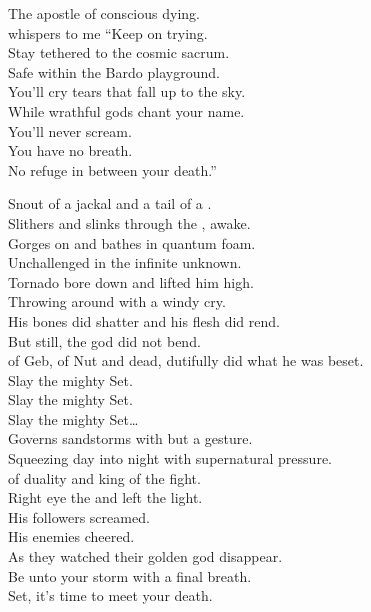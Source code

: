 The apostle of conscious dying. \\
whispers to me ``Keep on trying. \\
Stay tethered to the cosmic sacrum. \\
Safe within the Bardo playground. \\
You'll cry tears that fall up to the sky. \\
While wrathful gods chant your name. \\
You'll never scream. \\
You have no breath. \\
No refuge in between your death.'' \\



Snout of a jackal and a tail of a . \\
Slithers and slinks through the , awake. \\
Gorges on  and bathes in quantum foam. \\
Unchallenged in the infinite unknown. \\

Tornado bore down and lifted him high. \\
Throwing  around with a windy cry. \\
His bones did shatter and his flesh did rend. \\
But still, the god did not bend. \\

 of Geb, of Nut and dead, dutifully did what he was beset. \\

Slay the mighty Set. \\
Slay the mighty Set. \\
Slay the mighty Set… \\

Governs sandstorms with but a gesture. \\
Squeezing day into night with supernatural pressure. \\
 of duality and king of the fight. \\
Right eye the  and left the  light. \\
His followers screamed. \\
His enemies cheered. \\
As they watched their golden god disappear. \\
Be unto your storm with a final breath. \\
Set, it's time to meet your death. \\

